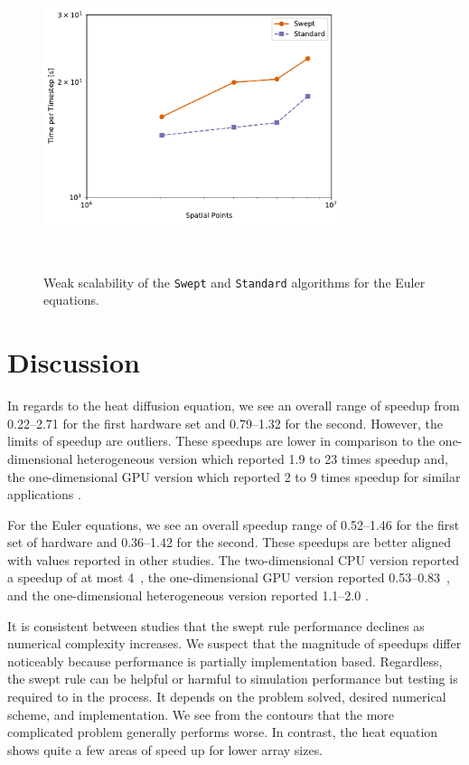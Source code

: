 \documentclass[preprints,article,accept,moreauthors,pdftex]{Definitions/mdpi}
\def\Swept{\texttt{Swept}}
\def\Standard{\texttt{Standard}}
\begin{document}
\begin{figure}[htbp]
    \centering
    \includegraphics[height=9cm,width=0.78\textwidth, trim={0cm 0.75cm 1cm 1.25cm},clip]{figs/weakScalabilityEuler.pdf}
    \caption{Weak scalability of the \Swept{} and \Standard{} algorithms for the Euler equations.}
    \label{fig:scalabilityEuler}
\end{figure}

\section{Discussion}
\label{discussion-section}

In regards to the heat diffusion equation, we see an overall range of speedup from 0.22--2.71 for the first hardware set and 0.79--1.32 for the second. However, the limits of speedup are outliers. These speedups are lower in comparison to the one-dimensional heterogeneous version which reported 1.9 to 23 times speedup \cite{Magee2020ApplyingSystems} and, the one-dimensional GPU version which reported 2 to 9 times speedup for similar applications \cite{Magee2018AcceleratingDecomposition}. 

For the Euler equations, we see an overall speedup range of 0.52--1.46 for the first set of hardware and 0.36--1.42 for the second. 
These speedups are better aligned with values reported in other studies. 
The two-dimensional CPU version reported a speedup of at most 4~\cite{Alhubail2018ThePDEs}, the one-dimensional GPU version reported 0.53--0.83~\cite{Magee2018AcceleratingDecomposition}, and the one-dimensional heterogeneous version reported 1.1--2.0 \cite{Magee2020ApplyingSystems}.

It is consistent between studies that the swept rule performance declines as numerical complexity increases. We suspect that the magnitude of speedups differ noticeably because performance is partially implementation based. Regardless, the swept rule can be helpful or harmful to simulation performance but testing is required to in the process. It depends on the problem solved, desired numerical scheme, and implementation.  
We see from the contours that the more complicated problem generally performs worse. In contrast, the heat equation shows quite a few areas of speed up for lower array sizes. 
\end{document}
